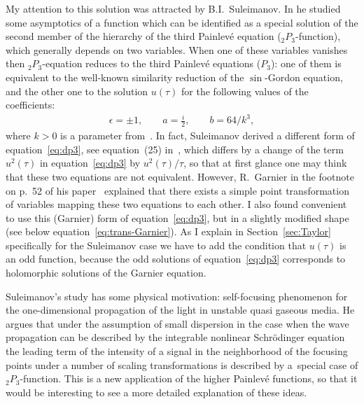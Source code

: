 \documentclass[pdftex]{sigma}
\numberwithin{equation}{section}
\begin{document}
My attention to this solution was attracted by B.I.~Suleimanov. In \cite{S} he studied some asymptotics
of a function which can be identified as a special solution of the second member of the hierarchy of the
third Painlev\'e equation (${}_2P_3$-function), which generally depends on two variables. When one of these
variables vanishes then ${}_2P_3$-equation reduces to the third Painlev\'e equations ($P_3$): one of them is
equivalent to the well-known similarity reduction of the $\sin$-Gordon equation, and the other one to the
solution $u(\tau)$ for the following values of the coefficients:
\begin{gather*}
\epsilon=\pm1,\qquad
a=\frac{i}2,\qquad
b=64/k^3,
\end{gather*}
where $k>0$ is a parameter from~\cite{S}. In fact, Suleimanov derived a different form of equation~\eqref{eq:dp3},
see equation~(25) in~\cite{S}, which differs by a change of the term $u^2(\tau)$ in equation~\eqref{eq:dp3}
by $u^2(\tau)/\tau$, so that at first glance one may think that these two equations are not equivalent.
However, R.~Garnier in the footnote on p.~52 of his paper~\cite{G} explained that there exists a simple point
transformation of variables mapping these two equations to each other. I also found convenient to use this (Garnier)
form of equation~\eqref{eq:dp3}, but in a slightly modified shape (see below equation~\eqref{eq:trans-Garnier}).
As I explain in Section~\ref{sec:Taylor} specifically for the Suleimanov case we have to add the condition that
$u(\tau)$ is an odd function, because the odd solutions of equation~\eqref{eq:dp3} corresponds to holomorphic
solutions of the Garnier equation.

Suleimanov's study has some physical motivation: self-focusing phenomenon for the one-dimensional
propagation of the light in unstable quasi gaseous media. He argues that under the assumption of small dispersion
in the case when the wave propagation can be described by the integrable nonlinear Schr\"odinger equation the
leading term of the intensity of a signal in the neighborhood of the focusing points under a number of scaling
transformations is described by a~special case of ${}_2P_3$-function. This is a new application of the higher
Painlev\'e functions, so that it would be interesting to see a more detailed explanation of these ideas.
\end{document}
